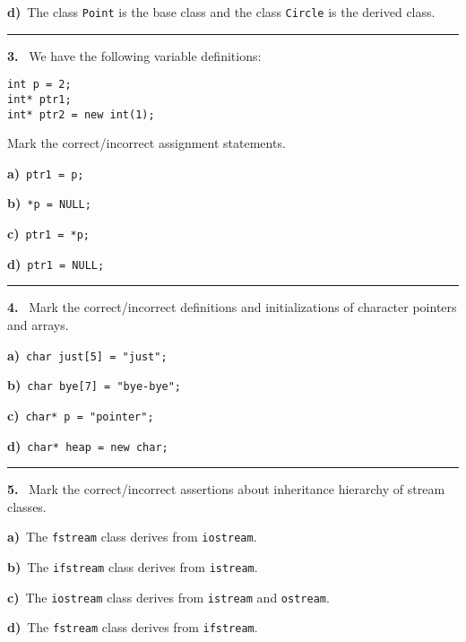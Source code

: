 \begin{multicols}{2}
{\bf d)}\ The class \verb|Point| is the base class and the class \verb|Circle| is the derived class.

\par\smallskip\hrule\par\medskip

{\bf 3. }\ We have the following variable definitions:
 \vspace{-3mm}\begin{verbatim}
int p = 2;
int* ptr1;
int* ptr2 = new int(1);
 \end{verbatim}\vspace{-6mm}
Mark the correct/incorrect assignment statements.

{\bf a)}\ \verb|ptr1 = p;|

{\bf b)}\ \verb|*p = NULL;|

{\bf c)}\ \verb|ptr1 = *p;|

{\bf d)}\ \verb|ptr1 = NULL;|

\par\smallskip\hrule\par\medskip

{\bf 4. }\ Mark the correct/incorrect definitions and initializations 
of character pointers and arrays.

{\bf a)}\ \verb|char just[5] = "just";|

{\bf b)}\ \verb|char bye[7] = "bye-bye";|

{\bf c)}\ \verb|char* p = "pointer";|

{\bf d)}\ \verb|char* heap = new char;|

\par\smallskip\hrule\par\medskip

{\bf 5. }\ Mark the correct/incorrect assertions about inheritance
hierarchy of stream classes.

{\bf a)}\ The \verb|fstream| class derives from \verb|iostream|.

{\bf b)}\ The \verb|ifstream| class derives from \verb|istream|.

{\bf c)}\ The \verb|iostream| class derives from \verb|istream| and \verb|ostream|.

{\bf d)}\ The \verb|fstream| class derives from \verb|ifstream|.

\end{multicols}


